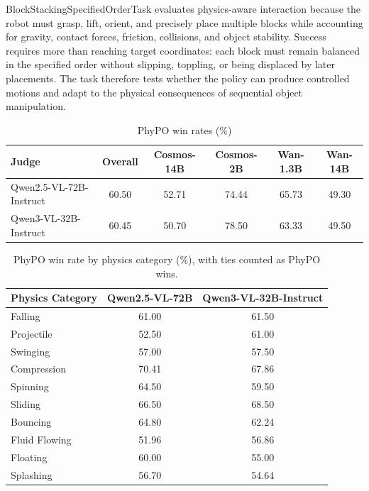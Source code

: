 \documentclass{article}
\begin{document}
\FloatBarrier

BlockStackingSpecifiedOrderTask evaluates physics-aware interaction because the robot must grasp, lift, orient, and precisely place multiple blocks while accounting for gravity, contact forces, friction, collisions, and object stability. Success requires more than reaching target coordinates: each block must remain balanced in the specified order without slipping, toppling, or being displaced by later placements. The task therefore tests whether the policy can produce controlled motions and adapt to the physical consequences of sequential object manipulation.


\begin{table}[t]
\centering
\caption{PhyPO win rates (\%)}
\label{tab:phypo_win_rates}
\begin{tabular}{lccccc}
\toprule
\textbf{Judge} &
\textbf{Overall} &
\textbf{Cosmos-14B} &
\textbf{Cosmos-2B} &
\textbf{Wan-1.3B} &
\textbf{Wan-14B} \\
\midrule
Qwen2.5-VL-72B-Instruct & 60.50 & 52.71 & 74.44 & 65.73 & 49.30 \\
Qwen3-VL-32B-Instruct & 60.45 & 50.70 & 78.50 & 63.33 & 49.50 \\
\bottomrule
\end{tabular}
\end{table}


\begin{table}[t]
\centering
\caption{PhyPO win rate by physics category (\%), with ties counted as PhyPO wins.}
\label{tab:phypo_category_win_rates}
\begin{tabular}{lcc}
\toprule
\textbf{Physics Category} &
\textbf{Qwen2.5-VL-72B} &
\textbf{Qwen3-VL-32B-Instruct} \\
\midrule
Falling       & 61.00 & 61.50 \\
Projectile    & 52.50 & 61.00 \\
Swinging      & 57.00 & 57.50 \\
Compression   & 70.41 & 67.86 \\
Spinning      & 64.50 & 59.50 \\
Sliding       & 66.50 & 68.50 \\
Bouncing      & 64.80 & 62.24 \\
Fluid Flowing & 51.96 & 56.86 \\
Floating      & 60.00 & 55.00 \\
Splashing     & 56.70 & 54.64 \\
\bottomrule
\end{tabular}
\end{table}
\end{document}
